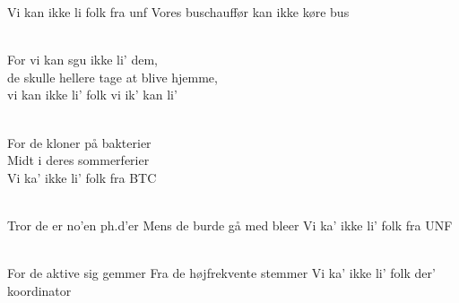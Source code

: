 \begin{song}{Vi kan ikke li folk fra unf}
  {} %
  {Vores buschauffør kan ikke køre bus} %
  {} %
  {} %
  {\NotCCLIed} %

 \begin{SBVerse}
    \\
    For vi kan sgu ikke li' dem,\\
    de skulle hellere tage at blive hjemme,\\
    vi kan ikke li' folk vi ik' kan li'
  \end{SBVerse}

  \begin{SBVerse}
    \\
    For de kloner på bakterier\\
    Midt i deres sommerferier\\
    Vi ka’ ikke li’ folk fra BTC
  \end{SBVerse}

  \begin{SBVerse}
    \\
    Tror de er no’en ph.d’er 
    Mens de burde gå med bleer 
    Vi ka’ ikke li’ folk fra UNF
  \end{SBVerse}

  \begin{SBVerse}
    \\
    For de aktive sig gemmer 
    Fra de højfrekvente stemmer
    Vi ka’ ikke li’ folk der’ koordinator
  \end{SBVerse}
  
\end{song}